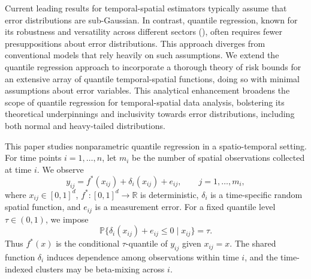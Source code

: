 \documentclass[twoside,11pt]{article}
\newenvironment{revision}{\color{revisionred}}{}
\begin{document}
Current leading results for temporal-spatial estimators typically assume that error distributions are sub-Gaussian. In contrast, quantile regression, known for its robustness and versatility across different sectors (\cite{coad2006innovation, sanderson2006statistically, perlich2007high, benoit2009benefits, wasko2014quantile, pata2015astronomical, belloni2023high,zhang2023risk}), often requires fewer presuppositions about error distributions. This approach diverges from conventional models that rely heavily on such assumptions. We extend the quantile regression approach to incorporate a thorough theory of risk bounds for an extensive array of quantile temporal-spatial functions, doing so with minimal assumptions about error variables. This analytical enhancement broadens the scope of quantile regression for temporal-spatial data analysis, bolstering its theoretical underpinnings and inclusivity towards error distributions, including both normal and heavy-tailed distributions.




\begin{revision}
This paper studies nonparametric quantile regression in a spatio-temporal setting. For time points $i=1,\ldots,n$, let $m_i$ be the number of spatial observations collected at time $i$. We observe
\begin{equation}
 y_{ij}=f^*(x_{ij})+\delta_i(x_{ij})+e_{ij},
 \qquad j=1,\ldots,m_i,                                      \label{ass_1_1}
\end{equation}
where $x_{ij}\in[0,1]^d$, $f^*:[0,1]^d\to\mathbb R$ is deterministic, $\delta_i$ is a time-specific random spatial function, and $e_{ij}$ is a measurement error. For a fixed quantile level $\tau\in(0,1)$, we impose
\begin{equation}
 \mathbb P\{\delta_i(x_{ij})+e_{ij}\le0\mid x_{ij}\}=\tau. \label{eq:quantile_calibration_full}
\end{equation}
Thus $f^*(x)$ is the conditional $\tau$-quantile of $y_{ij}$ given $x_{ij}=x$. The shared function $\delta_i$ induces dependence among observations within time $i$, and the time-indexed clusters may be beta-mixing across $i$.
\end{revision}
\end{document}
